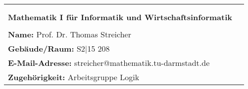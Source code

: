 \begin{tabular}{lc}
                                                                  & \\&               \\
    \textbf{Mathematik I für Informatik und Wirtschaftsinformatik}
    & \multirow{4}{*}{} \\
                                                                  &                   \\
    \textbf{Name:} Prof. Dr. Thomas Streicher                     &                   \\
    \textbf{Gebäude/Raum:} S2$|$15 208                            &                   \\
    \textbf{E-Mail-Adresse:} streicher@mathematik.tu-darmstadt.de &                   \\
    \textbf{Zugehörigkeit:} Arbeitsgruppe Logik                   &                   \\
\end{tabular}

\newpage
